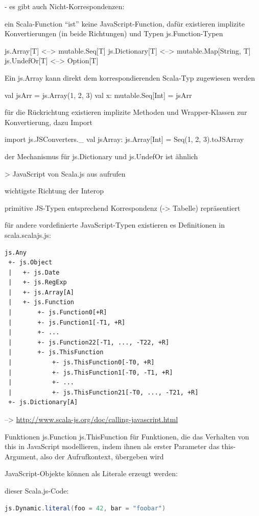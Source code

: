 \documentclass[a4paper, 12pt, hidelinks, listof=totoc, listoftables=totoc, bibliography=totoc]{scrreprt}
\begin{document}
- es gibt auch Nicht-Korrespondenzen:

ein Scala-Function "`ist"' keine JavaScript-Function, dafür existieren implizite Konvertierungen (in beide Richtungen) und Typen js.Function-Typen


js.Array[T] <--> mutable.Seq[T]
js.Dictionary[T] <--> mutable.Map[String, T]
js.UndefOr[T] <--> Option[T]

Ein js.Array kann direkt dem korrespondierenden Scala-Typ zugewiesen werden

val jsArr = js.Array(1, 2, 3)
val x: mutable.Seq[Int] = jsArr

für die Rückrichtung existieren implizite Methoden und Wrapper-Klassen zur Konvertierung, dazu Import

import js.JSConverters.\_
val jsArray: js.Array[Int] = Seq(1, 2, 3).toJSArray

der Mechanismus für js.Dictionary und js.UndefOr ist ähnlich



> JavaScript von Scala.js aus aufrufen

wichtigste Richtung der Interop

primitive JS-Typen entsprechend Korrespondenz (-> Tabelle) repräsentiert

für andere vordefinierte JavaScript-Typen existieren es Definitionen in scala.scalajs.js:

\begin{lstlisting}
js.Any
 +- js.Object
 |   +- js.Date
 |   +- js.RegExp
 |   +- js.Array[A]
 |   +- js.Function
 |       +- js.Function0[+R]
 |       +- js.Function1[-T1, +R]
 |       +- ...
 |       +- js.Function22[-T1, ..., -T22, +R]
 |       +- js.ThisFunction
 |           +- js.ThisFunction0[-T0, +R]
 |           +- js.ThisFunction1[-T0, -T1, +R]
 |           +- ...
 |           +- js.ThisFunction21[-T0, ..., -T21, +R]
 +- js.Dictionary[A]
\end{lstlisting}
-->  \url{http://www.scala-js.org/doc/calling-javascript.html}


Funktionen
	js.Function
	js.ThisFunction für Funktionen, die das Verhalten von this in JavaScript modellieren, indem ihnen als erster Parameter das this-Argument, also der Aufrufkontext, übergeben wird

JavaScript-Objekte können als Literale erzeugt werden:

dieser Scala.js-Code:
\begin{lstlisting}[language=Scala]
js.Dynamic.literal(foo = 42, bar = "foobar")
\end{lstlisting}
\end{document}
